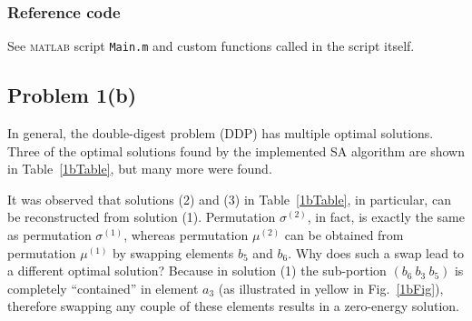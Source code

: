 \documentclass[12pt,A4,titlepage]{article}
\begin{document}
\subsubsection*{Reference code}
See \textsc{matlab} script \verb!Main.m! and custom functions called in the script itself.

\clearpage


\subsection*{Problem 1(b)}

\begin{table}[H]
\caption{\footnotesize Three optimal solutions found for \texttt{data\_1}. The solution ID has no particular meaning and was just introduced for convenience. They were not chosen randomly, though, but in order to illustrate a point.}
\label{1bTable}
\end{table}

\vspace*{-0.2cm}
In general, the double-digest problem (DDP) has multiple optimal solutions. Three of the optimal solutions found by the implemented SA algorithm are shown in Table~\ref{1bTable}, but many more were found.

It was observed that solutions (2) and (3) in Table~\ref{1bTable}, in particular, can be reconstructed from solution (1). Permutation $\sigma^{(2)}$, in fact, is exactly the same as permutation $\sigma^{(1)}$, whereas permutation $\mu^{(2)}$ can be obtained from permutation $\mu^{(1)}$ by swapping elements $b_5$ and $b_6$. Why does such a swap lead to a different optimal solution? Because in solution (1) the sub-portion $(b_6 \ b_3 \ b_5)$ is completely ``contained'' in element $a_3$ (as illustrated in yellow in Fig.~\ref{1bFig}), therefore swapping any couple of these elements results in a zero-energy solution.
\end{document}
